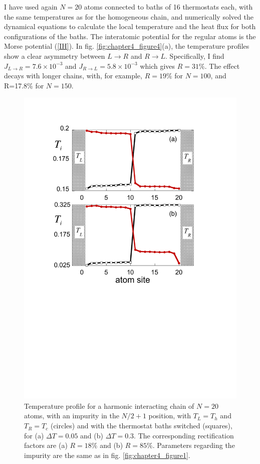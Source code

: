 I have used again $N=20$ atoms connected to baths of 16 thermostats each, with the same temperatures as for the homogeneous chain, and numerically solved the dynamical equations
to calculate the local temperature and the heat flux for both configurations of the baths. The interatomic potential for the regular atoms is the Morse potential (\ref{IH}).
In fig. \ref{fig:chapter4_figure4}(a), the temperature profiles show a clear asymmetry between ${L\rightarrow R}$ and ${R\rightarrow L}$. Specifically, I find $J_{L\rightarrow R}=7.6 \times 10^{-3}$ and $J_{R\rightarrow L}=5.8 \times 10^{-3}$ which gives
$R=31\%$. The effect decays with longer chains,  with, for example, $R=19\%$ for $N=100$, and R=17.8\% for $N=150$.

\begin{figure}
\centering
\includegraphics[width=0.75\linewidth]{Figures/FIG6.pdf}
\caption{Temperature profile for a harmonic interacting chain of $N=20$ atoms, with an impurity in the $N/2+1$ position, with $T_L=T_h$ and $T_R=T_c$ (circles) and with the thermostat baths switched (squares), for (a) $\Delta T = 0.05$ and (b)  $\Delta T = 0.3$. The corresponding rectification factors are (a) $R=18\%$ and (b) $R=85\%$. Parameters regarding the impurity are the same as in fig. \ref{fig:chapter4_figure1}.
}
\label{fig:chapter4_figure6}
\end{figure}

